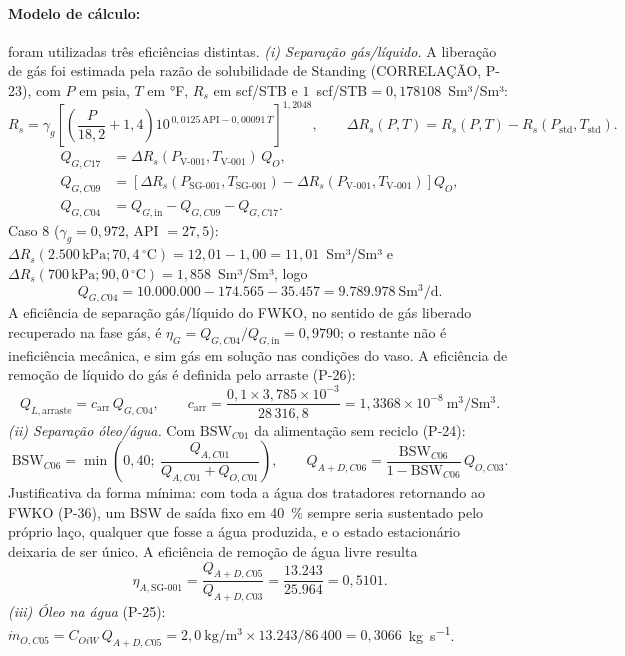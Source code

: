 \documentclass[11pt,a4paper]{article}
\numberwithin{equation}{section}
\numberwithin{table}{section}
\numberwithin{figure}{section}
\newcommand{\tipo}[1]{\textsf{\footnotesize #1}}
\begin{document}
\paragraph{Modelo de cálculo:} foram utilizadas três eficiências distintas.
\emph{(i) Separação gás/líquido.} A liberação de gás foi estimada pela razão de solubilidade de Standing (\tipo{CORRELAÇÃO}, P-23), com $P$ em psia, $T$ em °F, $R_s$ em scf/STB e $1$~scf/STB$=0{,}178108$~Sm³/Sm³:
\begin{equation}\label{eq:standing}
R_s=\gamma_g\left[\left(\frac{P}{18{,}2}+1{,}4\right)10^{\,0{,}0125\,\mathrm{API}-0{,}00091\,T}\right]^{1{,}2048},\qquad \Delta R_s(P,T)=R_s(P,T)-R_s(P_{\mathrm{std}},T_{\mathrm{std}}).
\end{equation}
\begin{align}
Q_{G,C17}&=\Delta R_s(P_{\mbox{V-001}},T_{\mbox{V-001}})\,Q_O,\label{eq:gasstages}\\
Q_{G,C09}&=\left[\Delta R_s(P_{\mbox{SG-001}},T_{\mbox{SG-001}})-\Delta R_s(P_{\mbox{V-001}},T_{\mbox{V-001}})\right]Q_O,\nonumber\\
Q_{G,C04}&=Q_{G,\mathrm{in}}-Q_{G,C09}-Q_{G,C17}.\nonumber
\end{align}
Caso 8 ($\gamma_g=0{,}972$, API $=27{,}5$): $\Delta R_s(2.500\,\mathrm{kPa};70{,}4\,^\circ\mathrm{C})=12{,}01-1{,}00=11{,}01$~Sm³/Sm³ e $\Delta R_s(700\,\mathrm{kPa};90{,}0\,^\circ\mathrm{C})=1{,}858$~Sm³/Sm³, logo
\begin{equation}
Q_{G,C04}=10.000.000-174.565-35.457=9.789.978\ \mathrm{Sm^3/d}.
\end{equation}
A eficiência de separação gás/líquido do FWKO, no sentido de gás liberado recuperado na fase gás, é $\eta_{G}=Q_{G,C04}/Q_{G,\mathrm{in}}=0{,}9790$; o restante não é ineficiência mecânica, e sim gás em solução nas condições do vaso. A eficiência de remoção de líquido do gás é definida pelo arraste (P-26):
\begin{equation}
Q_{L,\mathrm{arraste}}=c_{\mathrm{arr}}\,Q_{G,C04},\qquad c_{\mathrm{arr}}=\frac{0{,}1\times3{,}785\times10^{-3}}{28\,316{,}8}=1{,}3368\times10^{-8}\ \mathrm{m^3/Sm^3}.
\end{equation}
\emph{(ii) Separação óleo/água.} Com $\mathrm{BSW}_{C01}$ da alimentação sem reciclo (P-24):
\begin{equation}\label{eq:bswF}
\mathrm{BSW}_{C06}=\min\left(0{,}40;\ \frac{Q_{A,C01}}{Q_{A,C01}+Q_{O,C01}}\right),\qquad Q_{A+D,C06}=\frac{\mathrm{BSW}_{C06}}{1-\mathrm{BSW}_{C06}}\,Q_{O,C03}.
\end{equation}
Justificativa da forma mínima: com toda a água dos tratadores retornando ao FWKO (P-36), um BSW de saída fixo em 40~\% sempre seria sustentado pelo próprio laço, qualquer que fosse a água produzida, e o estado estacionário deixaria de ser único. A eficiência de remoção de água livre resulta
\begin{equation}
\eta_{A,\mbox{SG-001}}=\frac{Q_{A+D,C05}}{Q_{A+D,C03}}=\frac{13.243}{25.964}=0{,}5101.
\end{equation}
\emph{(iii) Óleo na água} (P-25): $\dot m_{O,C05}=C_{OiW}\,Q_{A+D,C05}=2{,}0\ \mathrm{kg/m^3}\times13.243/86\,400=0{,}3066$~\si{\kilogram\per\second}.
\end{document}
